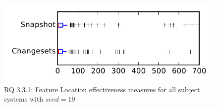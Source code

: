
\begin{figure}
\centering
\includegraphics[height=0.4\textheight]{figures/flt_seed/rq1_tiny_19}
\caption{RQ 3.3.1: Feature Location effectiveness measures for all subject systems with $seed=19$}
\label{fig:flt_seed:rq1:tiny}
\end{figure}
